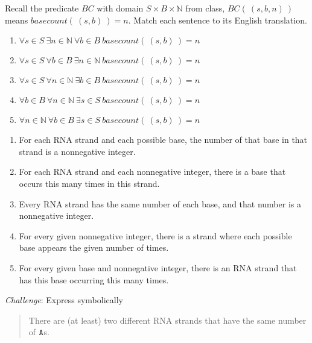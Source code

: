 
Recall the predicate $BC$ with domain $S \times B \times \mathbb{N}$ from class,
$BC(~(s,b,n)~)$ means $basecount(~(s,b)~) = n$.
Match each sentence to its English translation.
\begin{enumerate}
\item $\forall s \in S ~\exists n \in \mathbb{N} ~\forall b \in B ~basecount(~(s,b)~) = n$
\item $\forall s \in S ~\forall b \in B ~\exists n \in \mathbb{N} ~basecount(~(s,b)~) = n$
\item $\forall s \in S ~\forall n \in \mathbb{N} ~\exists b \in B ~basecount(~(s,b)~) = n$
\item $\forall b \in B ~\forall n \in \mathbb{N} ~\exists s \in S ~basecount(~(s,b)~) = n$
\item $\forall n \in \mathbb{N} ~\forall b \in B ~\exists s \in S ~basecount(~(s,b)~) = n$
\end{enumerate}

\begin{enumerate}[label=\roman*.]
    \item For each RNA strand and each possible base, the number of that base in that strand is a nonnegative integer.
    \item For each RNA strand and each nonnegative integer, there is a base that occurs this many times in this strand.
    \item Every RNA strand has the same number of each base, and that number is a nonnegative integer.
    \item For every given nonnegative integer, there is a strand where each possible base appears the given number of times.
    \item For every given base and nonnegative integer, there is an RNA strand that has this base occurring this many times.
\end{enumerate}


{\it Challenge}: Express symbolically

\begin{quote}
    There are (at least) two different RNA strands that have the same number of $\texttt{A}$s.
\end{quote}